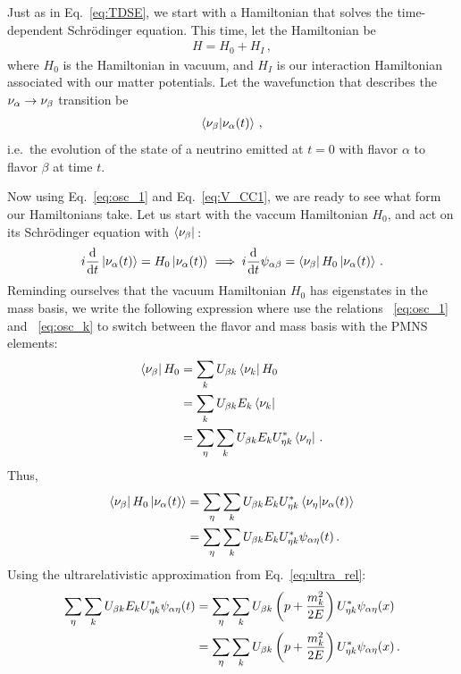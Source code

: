 Just as in Eq.~\ref{eq:TDSE}, we start with a Hamiltonian that solves the time-dependent Schrödinger equation. This time, let the Hamiltonian be 
\begin{align}
    H = H_0 + H_{I}\,,
\end{align}
where $H_0$ is the Hamiltonian in vacuum, and $H_{I}$ is our interaction Hamiltonian associated with our matter potentials.
Let the wavefunction that describes the $\nu_\alpha \to \nu_\beta$ transition be 
\begin{align}
    \bra{\nu_\beta}\ket{\nu_\alpha (t)}\,,
\end{align}
i.e.~the evolution of the state of a neutrino emitted at $t =0$ with flavor $\alpha$ to flavor $\beta$ at time $t$.

Now using Eq.~\ref{eq:osc_1} and Eq.~\ref{eq:V_CC1}, we are ready to see what form our Hamiltonians take.
Let us start with the vaccum Hamiltonian $H_0$, and act on its Schrödinger equation with $\bra{\nu_\beta}\,$:
\begin{align}
    i \dv{}{t}\ket{\nu_\alpha (t)} = H_0\ket{\nu_\alpha (t)} \implies i \dv{}{t}\psi_{\alpha\beta} = \bra{\nu_\beta}H_0\ket{\nu_\alpha (t)}\,.
\end{align}
Reminding ourselves that the vacuum Hamiltonian $H_0$ has eigenstates in the mass basis, we write the following expression where 
use the relations ~\ref{eq:osc_1} and ~\ref{eq:osc_k} to switch between the flavor and mass basis with the PMNS elements:
\begin{align}
    \bra{\nu_\beta} H_0 &= \sum_k U_{\beta k} \bra{\nu_k}H_0 \nonumber \\
                     &= \sum_k U_{\beta k} E_k \bra{\nu_k} \nonumber \\
                     &= \sum_\eta \sum_k U_{\beta k} E_k U^*_{\eta k} \bra{\nu_\eta}\,.
\end{align}
Thus,
\begin{align}
    \bra{\nu_\beta}H_0\ket{\nu_\alpha (t)} &= \sum_\eta \sum_k U_{\beta k} E_k U^*_{\eta k} \bra{\nu_\eta}\ket{\nu_\alpha (t)} \nonumber \\
                                    &= \sum_\eta \sum_k U_{\beta k} E_k U^*_{\eta k} \psi_{\alpha\eta}(t)\,.
\end{align}
Using the ultrarelativistic approximation from Eq.~\ref{eq:ultra_rel}:
\begin{align}
    \sum_\eta \sum_k U_{\beta k} E_k U^*_{\eta k} \psi_{\alpha\eta}(t) &= \sum_\eta \sum_k U_{\beta k} \left(p + \frac{m^2_k}{2E}\right) U^*_{\eta k} \psi_{\alpha\eta}(x) \nonumber \\
    &= \sum_\eta \sum_k U_{\beta k} \left(p + \frac{m^2_k}{2E}\right) U^*_{\eta k} \psi_{\alpha\eta}(x)\,.
\end{align}

